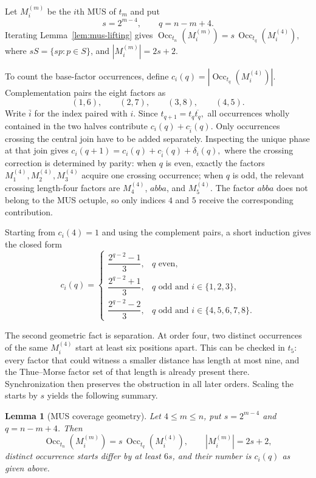 \documentclass[11pt,a4paper]{article}
\newtheorem{lemma}[theorem]{Lemma}
\theoremstyle{definition}\newtheorem{definition}[theorem]{Definition}
\theoremstyle{remark}\newtheorem{remark}[theorem]{Remark}
\newcommand{\Occ}{\operatorname{Occ}}
\begin{document}
Let $M_i^{(m)}$ be the $i$th MUS of $t_m$ and put
\[
 s=2^{m-4},
 \qquad
 q=n-m+4.
\]
Iterating Lemma~\ref{lem:mus-lifting} gives
$
 \Occ_{t_n}(M_i^{(m)})
   =s\,\Occ_{t_q}(M_i^{(4)}),
$
where $sS=\{sp:p\in S\}$, and
$
 |M_i^{(m)}|=2s+2.
$

To count the base-factor occurrences, define
$
 c_i(q)=|\Occ_{t_q}(M_i^{(4)})|.
$
Complementation pairs the eight factors as
\[
(1,6),\qquad(2,7),\qquad(3,8),\qquad(4,5).
\]
Write $\bar i$ for the index paired with $i$.  Since
$
 t_{q+1}=t_q\overline{t_q},
$
all occurrences wholly contained in the two halves contribute
$
 c_i(q)+c_{\bar i}(q).
$
Only occurrences crossing the central join have to be added separately.  Inspecting the unique phase at that join gives
$
 c_i(q+1)=c_i(q)+c_{\bar i}(q)+\delta_i(q),
$
where the crossing correction is determined by parity: when $q$ is even, exactly the factors $M_1^{(4)},M_2^{(4)},M_3^{(4)}$ acquire one crossing occurrence; when $q$ is odd, the relevant crossing length-four factors are $M_4^{(4)}$, $abba$, and $M_5^{(4)}$.  The factor $abba$ does not belong to the MUS octuple, so only indices $4$ and $5$ receive the corresponding contribution.

Starting from $c_i(4)=1$ and using the complement pairs, a short induction gives the closed form
\[
 c_i(q)=
 \begin{cases}
 \dfrac{2^{q-2}-1}{3},
   & q\text{ even},\\[1.1ex]
 \dfrac{2^{q-2}+1}{3},
   & q\text{ odd and }i\in\{1,2,3\},\\[1.1ex]
 \dfrac{2^{q-2}-2}{3},
   & q\text{ odd and }i\in\{4,5,6,7,8\}.
 \end{cases}
\]

The second geometric fact is separation.  At order four, two distinct occurrences of the same $M_i^{(4)}$ start at least six positions apart.  This can be checked in $t_5$: every factor that could witness a smaller distance has length at most nine, and the Thue--Morse factor set of that length is already present there.  Synchronization then preserves the obstruction in all later orders.  Scaling the starts by $s$ yields the following summary.

\begin{lemma}[MUS coverage geometry]
\label{lem:mus-coverage-geometry-extended}
Let $4\le m\le n$, put $s=2^{m-4}$ and $q=n-m+4$.  Then
\[
 \Occ_{t_n}(M_i^{(m)})
   =s\,\Occ_{t_q}(M_i^{(4)}),
 \qquad
 |M_i^{(m)}|=2s+2,
\]
distinct occurrence starts differ by at least $6s$, and their number is $c_i(q)$ as given above.
\end{lemma}
\end{document}

